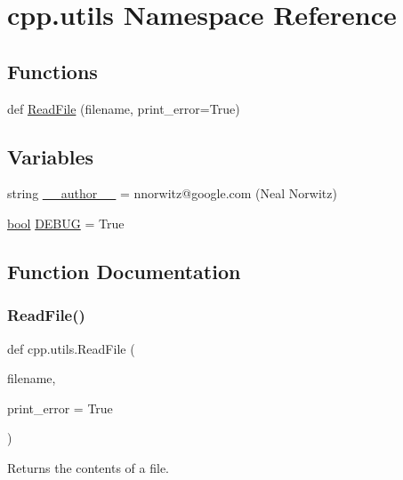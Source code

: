 \hypertarget{namespacecpp_1_1utils}{}\section{cpp.\+utils Namespace Reference}
\label{namespacecpp_1_1utils}
\subsection*{Functions}
\begin{DoxyCompactItemize}
\item 
def \hyperlink{namespacecpp_1_1utils_a4258aa53673d101d6f57320ec9a3c3a2}{Read\+File} (filename, print\+\_\+error=True)
\end{DoxyCompactItemize}
\subsection*{Variables}
\begin{DoxyCompactItemize}
\item 
string \hyperlink{namespacecpp_1_1utils_a4881c422e2e8cfc2e4f716b6f7bb0b58}{\+\_\+\+\_\+author\+\_\+\+\_\+} = \textquotesingle{}nnorwitz@google.\+com (Neal Norwitz)\textquotesingle{}
\item 
\hyperlink{classbool}{bool} \hyperlink{namespacecpp_1_1utils_aa59cfd61e9b0495b717753e45fe9d201}{D\+E\+B\+UG} = True
\end{DoxyCompactItemize}


\subsection{Function Documentation}
\mbox{\label{namespacecpp_1_1utils_a4258aa53673d101d6f57320ec9a3c3a2}} 
\subsubsection{\texorpdfstring{Read\+File()}{ReadFile()}}
{\footnotesize\ttfamily def cpp.\+utils.\+Read\+File (\begin{DoxyParamCaption}\item[{}]{filename,  }\item[{}]{print\+\_\+error = {\ttfamily True} }\end{DoxyParamCaption})}

\begin{DoxyVerb}Returns the contents of a file.\end{DoxyVerb}
 


